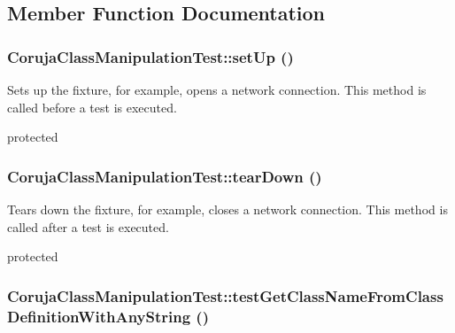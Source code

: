 \subsection{Member Function Documentation}
\hypertarget{class_coruja_class_manipulation_test_0689ef78070e399d14d8152d797ad32f}{
\subsubsection[{setUp}]{\setlength{\rightskip}{0pt plus 5cm}CorujaClassManipulationTest::setUp ()}}
\label{class_coruja_class_manipulation_test_0689ef78070e399d14d8152d797ad32f}


Sets up the fixture, for example, opens a network connection. This method is called before a test is executed.

protected \hypertarget{class_coruja_class_manipulation_test_bb345ca2d0b9f7c3525edbc0f3ace254}{
\subsubsection[{tearDown}]{\setlength{\rightskip}{0pt plus 5cm}CorujaClassManipulationTest::tearDown ()}}
\label{class_coruja_class_manipulation_test_bb345ca2d0b9f7c3525edbc0f3ace254}


Tears down the fixture, for example, closes a network connection. This method is called after a test is executed.

protected \hypertarget{class_coruja_class_manipulation_test_ff7a03d9aea2786f8cb04b38b194b53f}{
\subsubsection[{testGetClassNameFromClassDefinitionWithAnyString}]{\setlength{\rightskip}{0pt plus 5cm}CorujaClassManipulationTest::testGetClassNameFromClassDefinitionWithAnyString ()}}
\label{class_coruja_class_manipulation_test_ff7a03d9aea2786f8cb04b38b194b53f}


